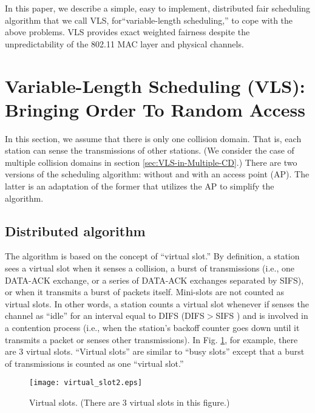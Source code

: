 \documentclass[letterpaper, 10 pt, conference]{ieeeconf}
\begin{document}
In this paper, we describe a simple, easy to implement, distributed fair scheduling algorithm that we call
VLS, for``variable-length scheduling,'' to cope with the above problems.
VLS provides exact weighted fairness despite the unpredictability of the 802.11
MAC layer and physical channels.


\section{Variable-Length Scheduling (VLS): Bringing Order To Random Access}

In this section, we assume that there is only one collision domain. That is, each
station can sense the transmissions of other stations. (We consider
the case of multiple collision domains in section \ref{sec:VLS-in-Multiple-CD}.)
There are two versions of the scheduling algorithm: without and with an access point (AP). 
The latter is
an adaptation of the former that utilizes the  AP to simplify the algorithm.


\subsection{\label{sub:Distributed-algorithm}Distributed algorithm}

The algorithm is based on the concept of {}``virtual slot.'' By definition, a station
sees a virtual slot when it senses a collision, a burst of transmissions
(i.e., one DATA-ACK exchange, or a series of DATA-ACK exchanges separated
by SIFS), or when it transmits a burst of packets itself. Mini-slots
are not counted as virtual slots. In other words, a station counts a virtual slot whenever
if senses the channel as {}``idle'' for an interval equal to DIFS (DIFS$>$SIFS \cite{80211}) and is involved in a contention
process (i.e., when the station's backoff counter goes down until it transmits a
packet or senses other transmissions). In Fig. \ref{fig:Virtual-slots}, for example, there are
3 virtual slots. {}``Virtual slots'' are similar to {}``busy slots''
except that a burst of transmissions is counted as one {}``virtual
slot.''

\begin{figure}
\noindent \begin{centering}
\texttt{[image: virtual\_slot2.eps]}
\end{centering}
\caption{\label{fig:Virtual-slots}Virtual slots. (There are 3 virtual slots
in this figure.)}
\end{figure}
\end{document}
